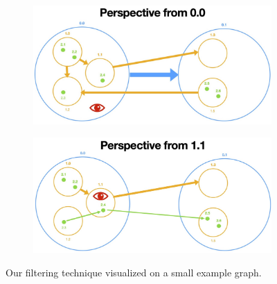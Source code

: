 \begin{figure}[h]
\begin{subfigure}[b]{0.6\columnwidth}
        \label{fig:linkFilter-outside}
    \end{subfigure}
    \begin{subfigure}[b]{0.6\columnwidth}
        \centering
        \includegraphics[width=\textwidth]{graphics/filterLinks/layer0.jpg}
        \label{fig:linkFilter-layer1}
    \end{subfigure}
    \begin{subfigure}[b]{0.6\columnwidth}
        \centering
        \includegraphics[width=\textwidth]{graphics/filterLinks/layer1.jpg}
        \label{fig:linkFilter-layer2}
    \end{subfigure}
    \caption[Optional caption for the figure list (often used to abbreviate long captions)]{Our filtering technique visualized on a small example graph.} %
    \label{fig:intro} 
  \end{figure}

